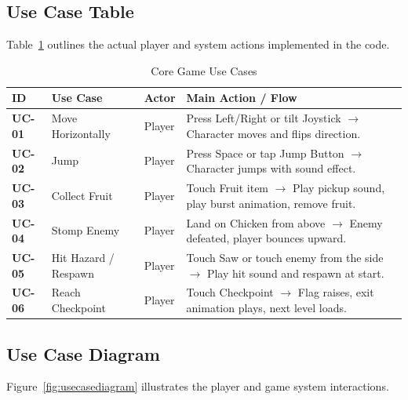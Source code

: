 \documentclass[11pt,a4paper]{article}
\begin{document}
\subsection{Use Case Table}
Table~\ref{tab:usecases} outlines the actual player and system actions implemented in the code.

\begin{table}[htbp]
\centering
\small
\caption{Core Game Use Cases}
\label{tab:usecases}
\begin{tabularx}{\textwidth}{l p{3.2cm} p{2.2cm} X}
\toprule
\textbf{ID} & \textbf{Use Case} & \textbf{Actor} & \textbf{Main Action / Flow} \\
\midrule
\textbf{UC-01} & Move Horizontally & Player & Press Left/Right or tilt Joystick $\rightarrow$ Character moves and flips direction. \\
\midrule
\textbf{UC-02} & Jump & Player & Press Space or tap Jump Button $\rightarrow$ Character jumps with sound effect. \\
\midrule
\textbf{UC-03} & Collect Fruit & Player & Touch Fruit item $\rightarrow$ Play pickup sound, play burst animation, remove fruit. \\
\midrule
\textbf{UC-04} & Stomp Enemy & Player & Land on Chicken from above $\rightarrow$ Enemy defeated, player bounces upward. \\
\midrule
\textbf{UC-05} & Hit Hazard / Respawn & Player & Touch Saw or touch enemy from the side $\rightarrow$ Play hit sound and respawn at start. \\
\midrule
\textbf{UC-06} & Reach Checkpoint & Player & Touch Checkpoint $\rightarrow$ Flag raises, exit animation plays, next level loads. \\
\bottomrule
\end{tabularx}
\end{table}

\subsection{Use Case Diagram}
Figure~\ref{fig:usecasediagram} illustrates the player and game system interactions.
\end{document}
